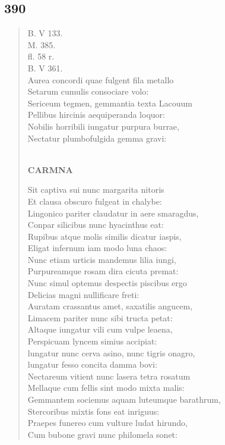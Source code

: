 \documentclass[11pt, a4paper]{report}
\begin{document}
            \subsection*{390}
      \begin{verse}
      B. V 133. \\ M. 385. \\ fl. 58 r. \\ B. V 361. \\ Aurea concordi quae fulgent fila metallo \\ Setarum cumulis consociare volo: \\ Sericeum tegmen, gemmantia texta Lacouum \\ Pellibus hircinis aequiperanda loquor: \\ Nobilis horribili iungatur purpura burrae, \\ Nectatur plumbofulgida gemma gravi: \\ 
        ﻿\pagebreak 
    \begin{center} \textbf{CARMNA} \end{center} \marginpar{[304]} Sit captiva sui nunc margarita nitoris \\ Et clausa obscuro fulgeat in chalybe: \\ Lingonico pariter claudatur in aere smaragdus, \\ Conpar silicibus nunc hyacinthus eat: \\ Rupibus atque molis similis dicatur iaspis, \\ Eligat infernum iam modo luna chaos: \\ Nunc etiam urticis mandemus lilia iungi, \\ Purpureamque rosam dira cicuta premat: \\ Nunc simul optemus despectis piscibus ergo \\ Delicias magni nullificare freti: \\ Auratam crassantus amet, saxatilis angucem, \\ Limacem pariter nunc sibi tructa petat: \\ Altaque iungatur vili cum vulpe leaena, \\ Perspicuam lyncem simius accipiat: \\ lungatur nunc cerva asino, nunc tigris onagro, \\ lungatur fesso concita damma bovi: \\ Nectareum vitient nunc lasera tetra rosatum \\ Mellaque cum fellis sint modo mixta malis: \\ Gemmantem sociemus aquam luteumque barathrum, \\ Stercoribus mixtis fons eat inriguus: \\ Praepes funereo cum vulture ludat hirundo, \\ Cum bubone gravi nunc philomela sonet: \\ 

\end{verse}
\end{document}
